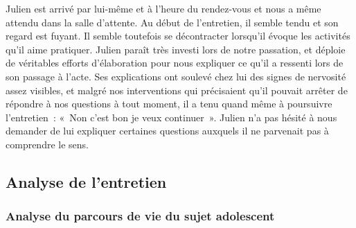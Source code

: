 \documentclass[12pt, a4paper]{book}
\begin{document}
\begin{spacing}{1.5}
Julien est arrivé par lui-même et à l'heure du rendez-vous et nous a même attendu dans la salle d'attente. Au  début de l'entretien, il semble tendu et son regard est fuyant. Il semble toutefois se décontracter lorsqu'il évoque les activités qu'il aime pratiquer. Julien paraît très investi lors de notre passation, et déploie de véritables efforts d'élaboration pour nous expliquer ce qu'il a ressenti lors de son passage à l'acte. Ses explications ont soulevé chez lui des signes de nervosité assez visibles, et malgré nos interventions qui précisaient qu'il pouvait arrêter de répondre à nos questions à tout moment, il a tenu quand même à poursuivre l'entretien : « Non c'est bon je veux continuer ». Julien n'a pas hésité à nous demander de lui expliquer certaines questions auxquels il ne parvenait pas à comprendre le sens. 

\subsection{Analyse de l'entretien}

\subsubsection{Analyse du parcours de vie du sujet adolescent}


\end{spacing}
\end{document}
